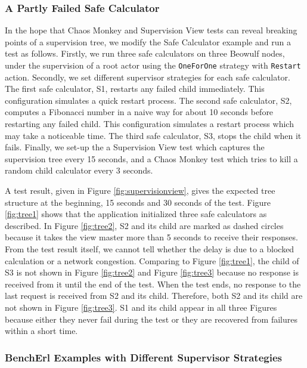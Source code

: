 \subsubsection{A Partly Failed Safe Calculator}
\label{calculator_chaos_test}

In the hope that Chaos Monkey and Supervision View tests can reveal breaking 
points of a supervision tree, we modify the Safe Calculator example and run a 
test as follows.  Firstly, we run three safe calculators on three Beowulf 
nodes, under the supervision of a root actor using the {\tt OneForOne} strategy 
with {\tt Restart} action.  Secondly, we set different supervisor strategies 
for each safe calculator.  The first safe calculator, S1, restarts any failed 
child immediately.  This configuration simulates a quick restart process.
The second safe calculator, S2, computes a Fibonacci number in a naive way for 
about 10 seconds before restarting any failed child.  This configuration 
simulates 
a restart process which may take a noticeable time.  The third safe calculator, 
S3, stops the child when it fails.  Finally, we set-up the a Supervision View 
test which captures the supervision tree every 15 seconds, and a Chaos Monkey 
test which tries to kill a random child calculator every 3 seconds.

A test result, given in Figure \ref{fig:supervisionview}, gives the expected
tree structure at the beginning, 15 seconds and 30 seconds of the test.  Figure 
\ref{fig:tree1} shows that the application initialized three safe calculators as 
described.  In Figure \ref{fig:tree2}, S2 and its child are marked as dashed 
circles because it takes the view master more than 5 seconds to receive their 
responses.  From the test result itself, we cannot tell whether the delay is 
due to a blocked calculation or a network congestion.  Comparing to Figure 
\ref{fig:tree1}, the child of S3 is not shown in Figure \ref{fig:tree2} and 
Figure \ref{fig:tree3} because no response is received from it until the end of 
the test.  When the test ends, no response to the last request is received 
from S2 and its child.  Therefore, both S2 and its child are not shown in 
Figure \ref{fig:tree3}.  S1 and its child appear in all three Figures because 
either they never fail during the test or they are recovered from failures 
within a short time.




\subsubsection{BenchErl Examples with Different Supervisor Strategies}
\label{bencherl_chaos_test}

